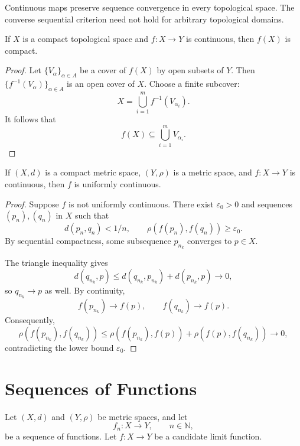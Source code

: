 \documentclass[answers,12pt,addpoints]{exam}
\begin{document}
\begin{remark}
Continuous maps preserve sequence convergence in every
topological space. The converse sequential criterion
need not hold for arbitrary topological domains.
\end{remark}

\begin{theorem}
If $X$ is a compact topological space and
$f:X\to Y$ is continuous, then $f(X)$ is compact.
\end{theorem}

\begin{proof}
Let $\{V_\alpha\}_{\alpha\in A}$ be a cover of $f(X)$
by open subsets of $Y$.
Then $\{f^{-1}(V_\alpha)\}_{\alpha\in A}$ is an open cover
of $X$. Choose a finite subcover:
\[
X=\bigcup_{i=1}^{m}f^{-1}(V_{\alpha_i}).
\]
It follows that
\[
f(X)\subseteq\bigcup_{i=1}^{m}V_{\alpha_i}.
\]
\end{proof}

\begin{theorem}
If $(X,d)$ is a compact metric space, $(Y,\rho)$ is a
metric space, and $f:X\to Y$ is continuous, then $f$ is
uniformly continuous.
\end{theorem}

\begin{proof}
Suppose $f$ is not uniformly continuous.
There exist $\varepsilon_0>0$ and sequences $(p_n),(q_n)$
in $X$ such that
\[
d(p_n,q_n)<1/n,
\qquad
\rho(f(p_n),f(q_n))\geq\varepsilon_0.
\]
By sequential compactness, some subsequence
$p_{n_k}$ converges to $p\in X$.

The triangle inequality gives
\[
d(q_{n_k},p)
\leq d(q_{n_k},p_{n_k})+d(p_{n_k},p)\to 0,
\]
so $q_{n_k}\to p$ as well.
By continuity,
\[
f(p_{n_k})\to f(p),
\qquad
f(q_{n_k})\to f(p).
\]
Consequently,
\[
\rho(f(p_{n_k}),f(q_{n_k}))
\leq
\rho(f(p_{n_k}),f(p))
+
\rho(f(p),f(q_{n_k}))
\to 0,
\]
contradicting the lower bound $\varepsilon_0$.
\end{proof}

\section{Sequences of Functions}

\begin{remark}[Setup]
Let $(X,d)$ and $(Y,\rho)$ be metric spaces, and let
\[
f_n:X\to Y,\qquad n\in\mathbb{N},
\]
be a sequence of functions. Let $f:X\to Y$ be a candidate
limit function.
\end{remark}
\end{document}
